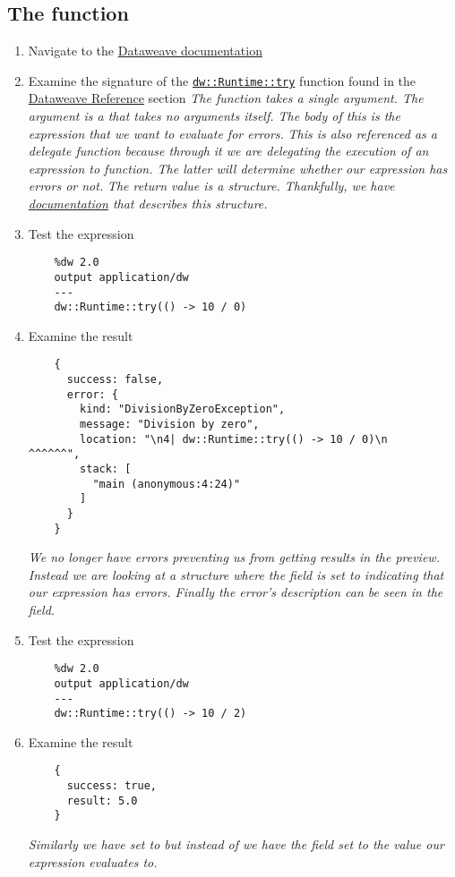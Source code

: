 \subsection{The  function}
\begin{enumerate}[resume*]
\item Navigate to the \href{https://docs.mulesoft.com/mule-runtime/4.3/dataweave}{Dataweave documentation}
\item Examine the signature of the \href{https://docs.mulesoft.com/mule-runtime/4.3/dw-runtime-functions-try}{\lstinline{dw::Runtime::try}} function found in the \href{https://docs.mulesoft.com/mule-runtime/4.3/dw-functions}{Dataweave Reference} section
  \newline
  \emph{
    The  function takes a single argument.  The argument is a \les{} that takes no arguments itself.  The body of this \les{} is the expression that we want to evaluate for errors.
  }
  \newline
  \emph{
    This \les{} is also referenced as a delegate function because through it we are delegating the execution of an expression to  function.  The latter will determine whether our expression has errors or not.
  }
  \newline
  \emph{
    The return value is a  structure.  Thankfully, we have \href{https://docs.mulesoft.com/mule-runtime/4.3/dw-runtime-types}{documentation} that describes this structure.
  }
\item Test the  expression
  \begin{verbatim}
    %dw 2.0
    output application/dw
    ---
    dw::Runtime::try(() -> 10 / 0)
  \end{verbatim}
\item Examine the result
  \begin{verbatim}
    {
      success: false,
      error: {
        kind: "DivisionByZeroException",
        message: "Division by zero",
        location: "\n4| dw::Runtime::try(() -> 10 / 0)\n                          ^^^^^^",
        stack: [
          "main (anonymous:4:24)"
        ]
      }
    }
  \end{verbatim}
  \emph{
    We no longer have errors preventing us from getting results in the preview.  Instead we are looking at a  structure where the  field is set to  indicating that our expression has errors.  Finally the error's description can be seen in the  field.
  }
\item Test the  expression
  \begin{verbatim}
    %dw 2.0
    output application/dw
    ---
    dw::Runtime::try(() -> 10 / 2)
  \end{verbatim}
\item Examine the result
  \begin{verbatim}
    {
      success: true,
      result: 5.0
    }
  \end{verbatim}
  \emph{
    Similarly we have  set to  but instead of  we have the  field set to the value our expression evaluates to.
  }


\end{enumerate}
